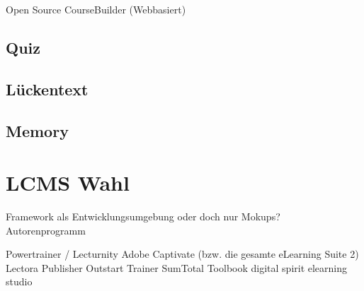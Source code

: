 \documentclass[a4paper, 12pt, twoside, BCOR=20mm, DIV=calc, abstracton, parskip=half*, toc=bibliography, toc=listof, headsepline, footsepline, headings=small, numbers=enddot]{scrreprt}
\begin{document}
	Open Source
	CourseBuilder (Webbasiert) 
	
	\subsection{Quiz}
	\subsection{Lückentext}
	\subsection{Memory}
	
	
	
	\section{\ac{LCMS} Wahl}
	Framework als Entwicklungsumgebung oder doch nur Mokups? 
	Autorenprogramm
	
	Powertrainer / Lecturnity 
	Adobe Captivate (bzw. die gesamte eLearning Suite 2) 
	Lectora Publisher 
	Outstart Trainer 
	SumTotal Toolbook 
	digital spirit elearning studio  
	
\end{document}
